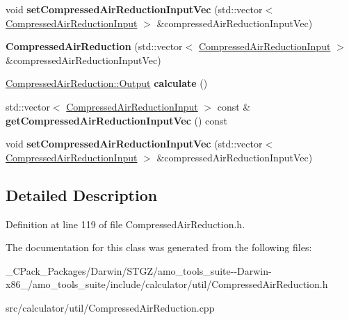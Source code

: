 \begin{DoxyCompactItemize}
\item 
\mbox{\label{class_compressed_air_reduction_a5ce8909011d63f84785014d7207a49de}} 
void {\bfseries set\+Compressed\+Air\+Reduction\+Input\+Vec} (std\+::vector$<$ \hyperlink{class_compressed_air_reduction_input}{Compressed\+Air\+Reduction\+Input} $>$ \&compressed\+Air\+Reduction\+Input\+Vec)
\item 
\mbox{\label{class_compressed_air_reduction_a94d9e61bf64e992c679c68510a21b6f2}} 
{\bfseries Compressed\+Air\+Reduction} (std\+::vector$<$ \hyperlink{class_compressed_air_reduction_input}{Compressed\+Air\+Reduction\+Input} $>$ \&compressed\+Air\+Reduction\+Input\+Vec)
\item 
\mbox{\label{class_compressed_air_reduction_a3d11a25bf311e886150d09cc308c47a2}} 
\hyperlink{struct_compressed_air_reduction_1_1_output}{Compressed\+Air\+Reduction\+::\+Output} {\bfseries calculate} ()
\item 
\mbox{\label{class_compressed_air_reduction_aad95f168b13d49824fbba687c7fa6ff9}} 
std\+::vector$<$ \hyperlink{class_compressed_air_reduction_input}{Compressed\+Air\+Reduction\+Input} $>$ const  \& {\bfseries get\+Compressed\+Air\+Reduction\+Input\+Vec} () const
\item 
\mbox{\label{class_compressed_air_reduction_a5ce8909011d63f84785014d7207a49de}} 
void {\bfseries set\+Compressed\+Air\+Reduction\+Input\+Vec} (std\+::vector$<$ \hyperlink{class_compressed_air_reduction_input}{Compressed\+Air\+Reduction\+Input} $>$ \&compressed\+Air\+Reduction\+Input\+Vec)
\end{DoxyCompactItemize}


\subsection{Detailed Description}


Definition at line 119 of file Compressed\+Air\+Reduction.\+h.



The documentation for this class was generated from the following files\+:\begin{DoxyCompactItemize}
\item 
\+\_\+\+C\+Pack\+\_\+\+Packages/\+Darwin/\+S\+T\+G\+Z/amo\+\_\+tools\+\_\+suite-\/-\/\+Darwin-\/x86\+\_/amo\+\_\+tools\+\_\+suite/include/calculator/util/Compressed\+Air\+Reduction.\+h\item 
src/calculator/util/Compressed\+Air\+Reduction.\+cpp\end{DoxyCompactItemize}

